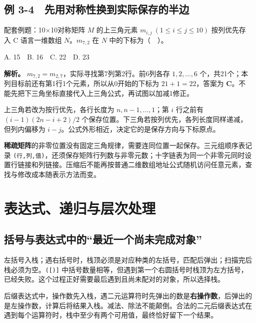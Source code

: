 \subsection{例 3-4　先用对称性换到实际保存的半边}\label{DS03-ex4}

\begin{example}[配套例题]

配套例题：10\ensuremath{\times}10对称矩阵 \(M\) 的上三角元素 \(m_{i,j}\ (1\le i\le j\le10)\) 按列优先存入 C 语言一维数组 \(N\)。\(m_{7,2}\) 在 \(N\) 中的下标为（　）。

A. 15　B. 16　C. 22　D. 23

\end{example}

\textbf{解析。} \(m_{7,2}=m_{2,7}\)，实际寻找第7列第2行。前6列各存 \(1,2,\ldots,6\) 个，共21个；本列目标前还有第1行1个元素，所以从0开始的下标为 \(21+1=22\)，答案为 \textbf{C}。不能先把下三角坐标直接代入上三角公式，再试图以加减1修正。

上三角若改为按行优先，各行长度为 \(n,n-1,\ldots,1\)；第 \(i\) 行之前有 \((i-1)(2n-i+2)/2\) 个保存位置。下三角若按列优先，各列长度同样递减，但列内偏移为 \(i-j\)。公式外形相近，决定它的是保存方向与下标原点。

\textbf{稀疏矩阵}的非零位置没有固定三角规律，需要连同位置一起保存。三元组顺序表记录 \texttt{(\allowbreak{}行,\allowbreak{}列,\allowbreak{}值)\allowbreak{}}，还须保存矩阵行列数与非零元数；十字链表为同一个非零元同时设置行链接和列链接。压缩后不能再按普通二维数组地址公式随机访问任意元素，查找与修改成本随表示方法而变。

\section{表达式、递归与层次处理}\label{DS03-07}

\subsection{括号与表达式中的``最近一个尚未完成对象''}\label{DS03-detail2}

左括号入栈；遇右括号时，栈顶必须是对应种类的左括号，匹配后弹出；扫描完后栈必须为空。\texttt{(\allowbreak{}[\allowbreak{})\allowbreak{}]\allowbreak{}} 中括号数量相等，但遇到第一个右圆括号时栈顶为左方括号，已经失败。这个过程正好需要最后遇到且尚未配对的对象，所以选择栈。

后缀表达式中，操作数先入栈，遇二元运算符时先弹出的数是\textbf{右操作数}，后弹出的是左操作数，计算后将结果入栈。减法、除法不能颠倒。合法的二元后缀表达式在遇到每个运算符时，栈中至少有两个可用值，最终恰好留下一个结果。

